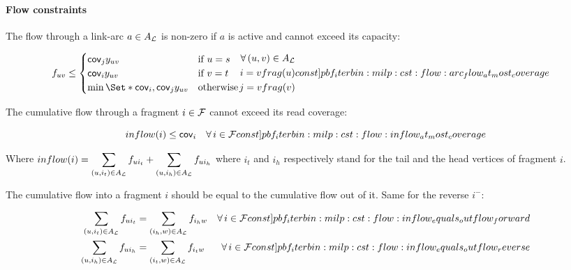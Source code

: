 \paragraph{Flow constraints}

The flow through a link-arc \(a \in A_{\mathcal{L}}{}\) is non-zero if \(a\) is active and cannot exceed its capacity:
\begin{Constraint}
  \begin{align}
    f_{uv} \leq
    \begin{cases}
      \cov{j} y_{uv} & \text{if \(u = s\)} \\
      \cov{i} y_{uv} & \text{if \(v = t\)} \\
      \min\Set*{\cov{i}, \cov{j}} y_{uv} & \text{otherwise}
    \end{cases} &
    \begin{split}
      \forall (u, v) \in A_\Links{} \\
      i = vfrag(u) \\
      j = vfrag(v)
    \end{split} \cstlabel{pbf_iterbin:milp:cst:flow:arc_flow_at_most_coverage} %
  \end{align}
\end{Constraint}

The cumulative flow through a fragment \(i \in \mathcal{F}{}\) cannot exceed its read coverage:
\begin{Constraint}
  \begin{equation}
    inflow(i) \leq \cov{i} \quad \forall i \in \Fragments{} \cstlabel{pbf_iterbin:milp:cst:flow:inflow_at_most_coverage} %
  \end{equation}
\end{Constraint}
Where \(\displaystyle inflow(i) = \sum_{(u, i_t) \in A_{\mathcal{L}}{}} f_{ui_t} + \sum_{(u, i_h) \in A_{\mathcal{L}}{}} f_{ui_h}\) where \(i_t\) and \(i_h\) respectively stand for the tail and the head vertices of fragment \(i\).

The cumulative flow into a fragment \(i\) should be equal to the cumulative flow out of it. Same for the reverse \(i^-\):
\begin{Constraint}
  \begin{align}
    \sum_{(u, i_t) \in A_\Links{}} f_{u i_t} & = \sum_{(i_h, w) \in A_\Links{}} f_{i_h w} & \forall i \in \Fragments{} \cstlabel{pbf_iterbin:milp:cst:flow:inflow_equals_outflow_forward} \\ %
    \sum_{(u, i_h) \in A_\Links{}} f_{u i_h} & = \sum_{(i_t, w) \in A_\Links{}} f_{i_t w} & \forall i \in \Fragments{} \cstlabel{pbf_iterbin:milp:cst:flow:inflow_equals_outflow_reverse} %
  \end{align}
\end{Constraint}

